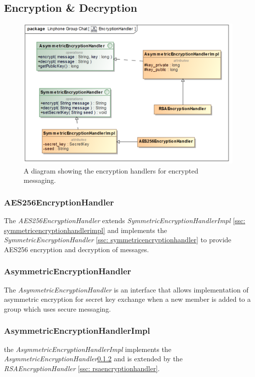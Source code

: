 \documentclass[11pt]{article}
\begin{document}
\subsection{Encryption \& Decryption}

\begin{figure}[H]
	\centering
	\includegraphics[width=5in]{./images/class_encryption_handler.png}
	\caption[EncryptionHandlers]{A diagram showing the encryption handlers for encrypted messaging.}
	\label{uml-encrypt-handler}
\end{figure}

\subsubsection{AES256EncryptionHandler}\label{ssc: aes256encryptionhandler}
The \textit{AES256EncryptionHandler} extends \textit{SymmetricEncryptionHandlerImpl} \ref{ssc: symmetricencryptionhandlerimpl} and implements the \textit{SymmetricEncryptionHandler} \ref{ssc: symmetricencryptionhandler} to provide AES256 encryption and decryption of messages. 
\subsubsection{AsymmetricEncryptionHandler}\label{ssc: asymmetricencryptionhandler}
The \textit{AsymmetricEncryptionHandler} is an interface that allows implementation of asymmetric encryption for secret key exchange when a new member is added to a group which uses secure messaging.
\subsubsection{AsymmetricEncryptionHandlerImpl}\label{ssc: asymmetricencryptionhandlerimpl}
the \textit{AsymmetricEncryptionHandlerImpl} implements the \textit{AsymmetricEncryptionHandler}\ref{ssc: asymmetricencryptionhandler} and is extended by the \textit{RSAEncryptionHandler} \ref{ssc: rsaencryptionhandler}.
\end{document}
